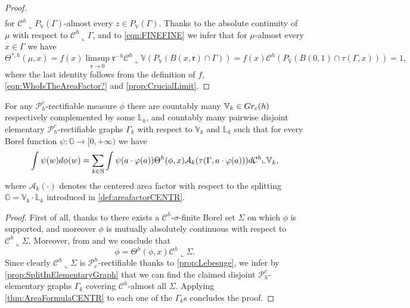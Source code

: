 \documentclass[10pt, a4paper,
oneside, headinclude,footinclude]{scrartcl}
\begin{document}
\begin{proof}
\begin{equation}
\begin{split}
    \end{split}
\end{equation}
for $\mathcal{C}^h\llcorner P_{\mathbb V}(\Gamma)$-almost every $z\in P_{\mathbb V}(\Gamma)$. Thanks to the absolute continuity of $\mu$ with respect to $\mathcal{C}^h\llcorner \Gamma$, and to \eqref{eqn:FINEFINE} we infer that for $\mu$-almost every $x\in \Gamma$ we have
$$
\Theta^{*,h}(\mu,x)=f(x)\limsup_{\mathfrak{r}\to 0}\mathfrak{r}^{-h}\mathcal{C}^h\llcorner \mathbb{V}(P_\mathbb{V}(B(x,\mathfrak{r})\cap \Gamma))=f(x)\mathcal{C}^h(P_{\mathbb V}(B(0,1)\cap\tau(\Gamma,x)))=1,
$$
where the last identity follows from the definition of $f$, \eqref{eqn:WhoIsTheAreaFactor?} and \cref{prop:CrucialLimit}.
\end{proof}

\begin{corollario}\label{cor:AreaFormulaMeasure}
For any $\mathscr{P}^c_h$-rectifiable measure $\phi$ there are countably many $\mathbb{V}_k\in Gr_c(h)$ respectively complemented by some $\mathbb{L}_k$, and countably many pairwise disjoint elementary $\mathscr{P}_h^c$-rectifiable graphs $\Gamma_k$ with respect to $\mathbb V_k$ and $\mathbb L_k$ such that for every Borel function $\psi:\mathbb{G}\to[0,+\infty)$ we have 
\begin{equation}\label{eqn:AreaFormulaCENTR2}
\int \psi(w)d\phi(w) = \sum_{k\in\mathbb{N}}\int \psi(a\cdot\varphi(a))\Theta^h(\phi,x)\mathcal{A}_k( \tau(\Gamma,a\cdot\varphi(a)))d\mathcal{C}^h\llcorner \mathbb{V}_k,
\end{equation}
where $\mathcal{A}_k(\cdot)$ denotes the centered area factor with respect to the splitting $\mathbb G=\mathbb V_k\cdot\mathbb L_k$ introduced in \cref{def:areafactorCENTR}.
\end{corollario}

\begin{proof}
First of all, thanks to \cite[Theorem 3.4, Proposition 2.5 and Proposition 2.6]{antonelli2020rectifiable} there exists a $\mathcal{C}^h$-$\sigma$-finite Borel set $\Sigma$ on which $\phi$ is supported, and moreover $\phi$ is mutually absolutely continuous with respect to $\mathcal{C}^h\llcorner\Sigma$. Moreover, from \cite[Theorem 4.13]{antonelli2020rectifiable} and \cite[Theorem 3.1]{FSSC15} we conclude that
$$\phi=\Theta^h(\phi,x)\mathcal{C}^h\llcorner \Sigma.$$
Since clearly $\mathcal{C}^h\llcorner \Sigma$ is $\mathscr{P}^h_c$-rectifiable thanks to \cref{prop:Lebesuge}, we infer by \cref{prop:SplitInElementaryGraph} 
that we can find the claimed disjoint $\mathscr{P}_h^c$-elementary graphs $\Gamma_k$ covering $\mathcal{C}^h$-almost all $\Sigma$. Applying \cref{thm:AreaFormulaCENTR} to each one of the $\Gamma_k$s concludes the proof.
\end{proof}
\end{document}
